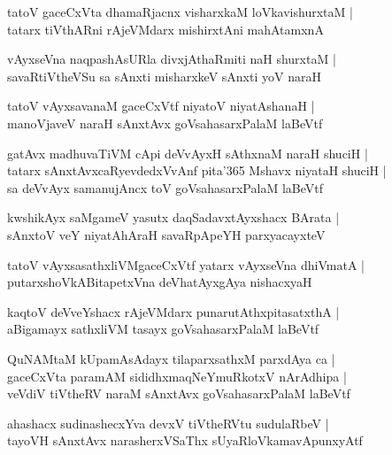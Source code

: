 \documentclass[twoside,12pt,openright]{book}
\newcounter{shloka}[chapter]
\begin{document}
\begin{shloka}
tatoV gaceCxVta dhamaRjacnx visharxkaM loVkavishurxtaM |\\
tatarx tiVthARni rAjeVMdarx mishirxtAni mahAtamxnA 
\end{shloka}

\begin{shloka}
vAyxseVna naqpashAsURla divxjAthaRmiti naH shurxtaM |\\
savaRtiVtheVSu sa sAnxti misharxkeV sAnxti yoV naraH 
\end{shloka}

\begin{shloka}
tatoV vAyxsavanaM gaceCxVtf niyatoV niyatAshanaH |\\
manoVjaveV naraH sAnxtAvx goVsahasarxPalaM laBeVtf
\end{shloka}

\begin{shloka}
gatAvx madhuvaTiVM cApi deVvAyxH sAthxnaM naraH shuciH |\\
tatarx sAnxtAvxcaRyevdedxVvAnf pita\char'365 Mshavx niyataH shuciH |\\
sa deVvAyx samanujAncx toV goVsahasarxPalaM laBeVtf
\end{shloka}

\begin{shloka}
kwshikAyx saMgameV yasutx daqSadavxtAyxshacx BArata |\\
sAnxtoV veY niyatAhAraH savaRpApeYH parxyacayxteV 
\end{shloka}

\begin{shloka}
tatoV vAyxsasathxliVMgaceCxVtf yatarx vAyxseVna dhiVmatA |\\
putarxshoVkABitapetxVna deVhatAyxgAya nishacxyaH 
\end{shloka}

\begin{shloka}
kaqtoV deVveYshacx rAjeVMdarx punarutAthxpitasatxthA |\\
aBigamayx  sathxliVM tasayx goVsahasarxPalaM laBeVtf
\end{shloka}

\begin{shloka}
QuNAMtaM kUpamAsAdayx tilaparxsathxM parxdAya ca |\\
gaceCxVta paramAM sididhxmaqNeYmuRkotxV nArAdhipa |\\
veVdiV tiVtheRV naraM sAnxtAvx goVsahasarxPalaM laBeVtf
\end{shloka}

\begin{shloka}
ahashacx sudinashecxYva devxV tiVtheRVtu sudulaRbeV |\\
tayoVH sAnxtAvx narasherxVSaThx sUyaRloVkamavApunxyAtf 
\end{shloka}
\end{document}
